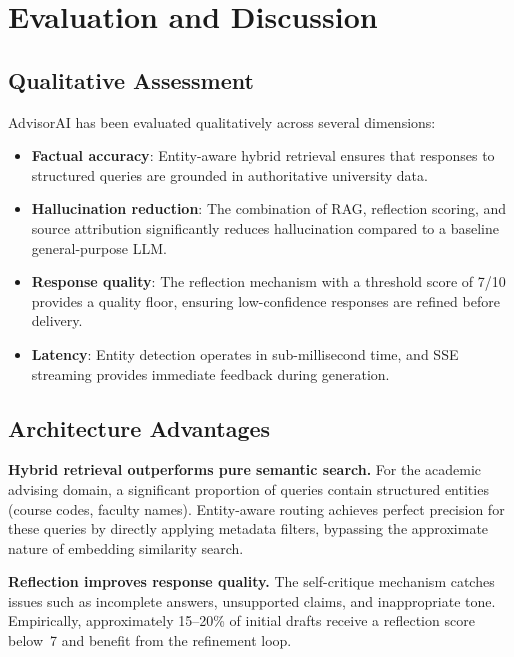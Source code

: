 \documentclass[conference,compsoc]{IEEEtran}
\begin{document}
\section{Evaluation and Discussion}
\label{sec:evaluation}

\subsection{Qualitative Assessment}

AdvisorAI has been evaluated qualitatively across several dimensions:

\begin{itemize}
    \item \textbf{Factual accuracy}: Entity-aware hybrid retrieval ensures that responses to structured queries are grounded in authoritative university data.
    \item \textbf{Hallucination reduction}: The combination of RAG, reflection scoring, and source attribution significantly reduces hallucination compared to a baseline general-purpose LLM.
    \item \textbf{Response quality}: The reflection mechanism with a threshold score of 7/10 provides a quality floor, ensuring low-confidence responses are refined before delivery.
    \item \textbf{Latency}: Entity detection operates in sub-millisecond time, and SSE streaming provides immediate feedback during generation.
\end{itemize}

\subsection{Architecture Advantages}

\textbf{Hybrid retrieval outperforms pure semantic search.}
For the academic advising domain, a significant proportion of queries contain structured entities (course codes, faculty names). Entity-aware routing achieves perfect precision for these queries by directly applying metadata filters, bypassing the approximate nature of embedding similarity search.

\textbf{Reflection improves response quality.}
The self-critique mechanism catches issues such as incomplete answers, unsupported claims, and inappropriate tone. Empirically, approximately 15--20\% of initial drafts receive a reflection score below~7 and benefit from the refinement loop.
\end{document}
